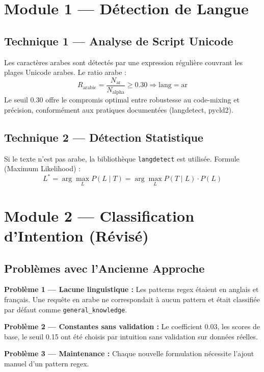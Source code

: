 \documentclass[11pt,a4paper]{article}
\begin{document}
\section{Module 1 --- Détection de Langue}

\subsection{Technique 1 --- Analyse de Script Unicode}

Les caractères arabes sont détectés par une expression régulière couvrant les plages Unicode arabes. Le ratio arabe :
\begin{equation}
R_{\text{arabic}} = \frac{N_{\text{ar}}}{N_{\text{alpha}}} \geq 0.30 \Longrightarrow \text{lang} = \text{ar}
\end{equation}
Le seuil 0.30 offre le compromis optimal entre robustesse au code-mixing et précision, conformément aux pratiques documentées (langdetect, pycld2).

\subsection{Technique 2 --- Détection Statistique}

Si le texte n'est pas arabe, la bibliothèque \texttt{langdetect} est utilisée. Formule (Maximum Likelihood) :
\begin{equation}
L^* = \arg\max_{L} P(L \mid T) = \arg\max_{L} P(T \mid L) \cdot P(L)
\end{equation}

\section{Module 2 --- Classification d'Intention (Révisé)}

\subsection{Problèmes avec l'Ancienne Approche}

\textbf{Problème 1 --- Lacune linguistique :} Les patterns regex étaient en anglais et français. Une requête en arabe ne correspondait à aucun pattern et était classifiée par défaut comme \texttt{general\_knowledge}.

\textbf{Problème 2 --- Constantes sans validation :} Le coefficient 0.03, les scores de base, le seuil 0.15 ont été choisis par intuition sans validation sur données réelles.

\textbf{Problème 3 --- Maintenance :} Chaque nouvelle formulation nécessite l'ajout manuel d'un pattern regex.
\end{document}
